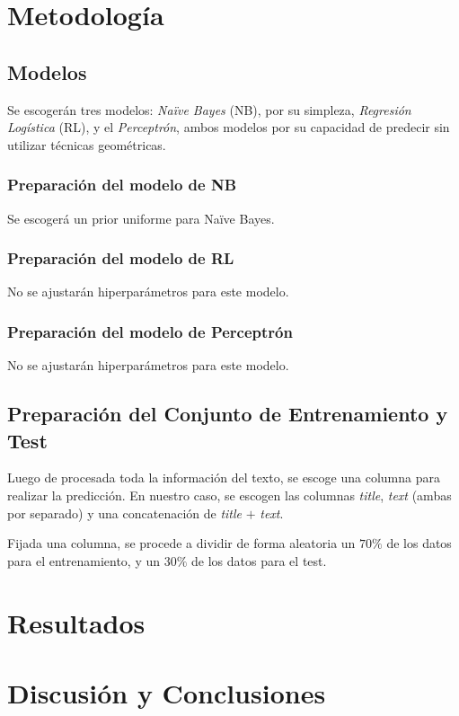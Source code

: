\section{Metodología}
{
\subsection{Modelos}
Se escogerán tres modelos: \textit{Naïve Bayes} (NB), por su simpleza, \textit{Regresión Logística} (RL), y el \textit{Perceptrón}, ambos modelos por su capacidad de predecir sin utilizar técnicas geométricas.

\subsubsection{Preparación del modelo de NB} 
Se escogerá un prior uniforme para Naïve Bayes.

\subsubsection{Preparación del modelo de RL}
No se ajustarán hiperparámetros para este modelo.

\subsubsection{Preparación del modelo de Perceptrón}
No se ajustarán hiperparámetros para este modelo.

\subsection{Preparación del Conjunto de Entrenamiento y Test}
Luego de procesada toda la información del texto, se escoge una columna para realizar la predicción. En nuestro caso, se escogen las columnas \textit{title}, \textit{text} (ambas por separado) y una concatenación de \textit{title} $+$ \textit{text}. 

Fijada una columna, se procede a dividir de forma aleatoria un $70\%$ de los datos para el entrenamiento, y un $30\%$ de los datos para el test.

}

\section{Resultados}
{



}

\section{Discusión y Conclusiones}
{
\lipsum[1]
}

